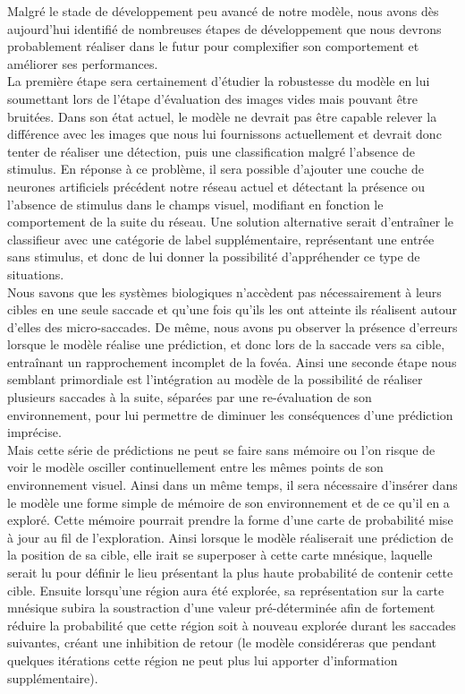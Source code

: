 Malgré le stade de développement peu avancé de notre modèle, nous avons dès aujourd'hui identifié de nombreuses étapes de développement que nous devrons probablement réaliser dans le futur pour complexifier son comportement et améliorer ses performances. \\
La première étape sera certainement d'étudier la robustesse du modèle en lui soumettant lors de l'étape d'évaluation des images vides mais pouvant être bruitées.
Dans son état actuel, le modèle ne devrait pas être capable relever la différence avec les images que nous lui fournissons actuellement et devrait donc tenter de réaliser une détection, puis une classification malgré l'absence de stimulus.
En réponse à ce problème, il sera possible d'ajouter une couche de neurones artificiels précédent notre réseau actuel et détectant la présence ou l'absence de stimulus dans le champs visuel, modifiant en fonction le comportement de la suite du réseau. 
Une solution alternative serait d'entraîner le classifieur avec une catégorie de label supplémentaire, représentant une entrée sans stimulus, et donc de lui donner la possibilité d'appréhender ce type de situations. \\
Nous savons que les systèmes biologiques n'accèdent pas nécessairement à leurs cibles en une seule saccade et qu'une fois qu'ils les ont atteinte ils réalisent autour d'elles des micro-saccades.
De même, nous avons pu observer la présence d'erreurs lorsque le modèle réalise une prédiction, et donc lors de la saccade vers sa cible, entraînant un rapprochement incomplet de la fovéa.
Ainsi une seconde étape nous semblant primordiale est l'intégration au modèle de la possibilité de réaliser plusieurs saccades à la suite, séparées par une re-évaluation de son environnement, pour lui permettre de diminuer les conséquences d'une prédiction imprécise. \autocite{Najemnik2005, Werner2014}\\
Mais cette série de prédictions ne peut se faire sans mémoire ou l'on risque de voir le modèle osciller continuellement entre les mêmes points de son environnement visuel.
Ainsi dans un même temps, il sera nécessaire d'insérer dans le modèle une forme simple de mémoire de son environnement et de ce qu'il en a exploré.
Cette mémoire pourrait prendre la forme d'une carte de probabilité mise à jour au fil de l'exploration.
Ainsi lorsque le modèle réaliserait une prédiction de la position de sa cible, elle irait se superposer à cette carte mnésique, laquelle serait lu pour définir le lieu présentant la plus haute probabilité de contenir cette cible.
Ensuite lorsqu'une région aura été explorée, sa représentation sur la carte mnésique subira la soustraction d'une valeur pré-déterminée afin de fortement réduire la probabilité que cette région soit à nouveau explorée durant les saccades suivantes, créant une inhibition de retour (le modèle considéreras que pendant quelques itérations cette région ne peut plus lui apporter d'information supplémentaire). \autocite{Najemnik2005, Werner2014, Zhaoping2014} \\
